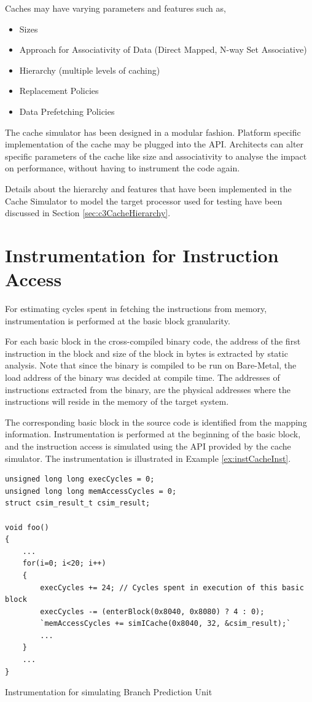 Caches may have varying parameters and features such as,
\begin{itemize} \itemsep -2pt
\item Sizes
\item Approach for Associativity of Data (Direct Mapped, N-way Set Associative)
\item Hierarchy (multiple levels of caching)
\item Replacement Policies
\item Data Prefetching Policies
\end{itemize}

The cache simulator has been designed in a modular fashion. Platform specific implementation of the cache may be plugged into the API. Architects can alter specific parameters of the cache like size and associativity to analyse the impact on performance, without having to instrument the code again.

Details about the hierarchy and features that have been implemented in the Cache Simulator to model the target processor used for testing have been discussed in Section \ref{sec:c3CacheHierarchy}.

\section{Instrumentation for Instruction Access}
For estimating cycles spent in fetching the instructions from memory, instrumentation is performed at the basic block granularity. 

For each basic block in the cross-compiled binary code, the address of the first instruction in the block and size of the block in bytes is extracted by static analysis. Note that since the binary is compiled to be run on Bare-Metal, the load address of the binary was decided at compile time. The addresses of instructions extracted from the binary, are the physical addresses where the instructions will reside in the memory of the target system.

The corresponding basic block in the source code is identified from the mapping information. Instrumentation is performed at the beginning of the basic block, and the instruction access is simulated using the API provided by the cache simulator. The instrumentation is illustrated in Example \ref{ex:instCacheInst}.

\vspace*{10pt}
\begin{Example}[h!]
\begin{lstlisting}
unsigned long long execCycles = 0;
unsigned long long memAccessCycles = 0;
struct csim_result_t csim_result;

void foo()
{
    ...
    for(i=0; i<20; i++)
    {
        execCycles += 24; // Cycles spent in execution of this basic block
        execCycles -= (enterBlock(0x8040, 0x8080) ? 4 : 0);
        `memAccessCycles += simICache(0x8040, 32, &csim_result);`
        ...
    }
    ...
}
\end{lstlisting}
\caption{Instrumentation for simulating Branch Prediction Unit}
\label{ex:instCacheInst}
\end{Example}

